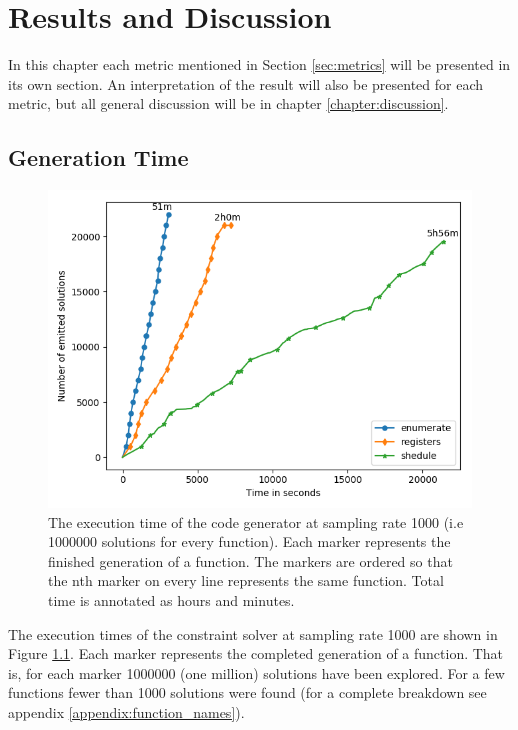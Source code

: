 \chapter{Results and Discussion}

In this chapter each metric mentioned in Section \ref{sec:metrics} will be presented in
its own section. An interpretation of the result will also be presented for each
metric, but all general discussion will be in chapter \ref{chapter:discussion}.

\section{Generation Time}

\begin{figure}[ht]
	\centering
	\includegraphics[width=\textwidth,height=0.5\textheight]{results/figures/generator_time}
	\caption{The execution time of the code generator at sampling rate 1000 (i.e 1000000 solutions for every function). Each marker represents the finished generation of a function. The markers are ordered so that the nth marker on every line represents the same function. Total time is annotated as hours and minutes.}
	\label{fig:time}
\end{figure}

The execution times of the constraint solver at sampling rate 1000 are shown in Figure
\ref{fig:time}. Each marker represents the completed generation of a function. That is,
for each marker 1000000 (one million) solutions have been explored. For a few functions
fewer than 1000 solutions were found (for a complete breakdown see appendix
\ref{appendix:function_names}).

